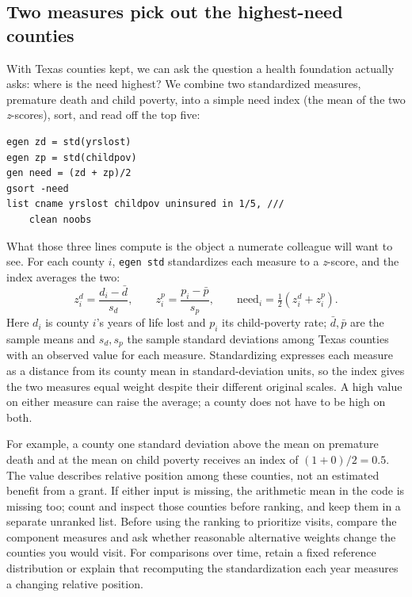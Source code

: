 \documentclass[
    a4paper,
    fontsize=10pt,
    twoside=true,
    numbers=noenddot,
]{kaobook}
\begin{document}
\subsection{Two measures pick out the highest-need counties}\label{sec:ch04-needindex}
With Texas counties kept, we can ask the question a health foundation actually asks: where is the need highest? We combine two standardized measures, premature death and child poverty, into a simple need index (the mean of the two \emph{z}-scores), sort, and read off the top five:
\par
{\footnotesize
\begin{verbatim}
egen zd = std(yrslost)
egen zp = std(childpov)
gen need = (zd + zp)/2
gsort -need
list cname yrslost childpov uninsured in 1/5, ///
    clean noobs
\end{verbatim}
}
What those three lines compute is the object a numerate colleague will
want to see. For each county $i$, \texttt{egen std} standardizes each
measure to a \emph{z}-score, and the index averages the two:
\[
z^{d}_i=\frac{d_i-\bar d}{s_d},\qquad
z^{p}_i=\frac{p_i-\bar p}{s_p},\qquad
\text{need}_i=\tfrac{1}{2}\!\left(z^{d}_i+z^{p}_i\right).
\]
Here $d_i$ is county $i$'s years of life lost and $p_i$ its child-poverty
rate; $\bar d,\bar p$ are the sample means and $s_d,s_p$ the sample
standard deviations among Texas counties with an observed value for each measure. Standardizing expresses each measure as a distance from its county mean in standard-deviation units, so the index gives the two measures equal weight despite their different original scales. A high value on either measure can raise the average; a county does not have to be high on both.

For example, a county one standard deviation above the mean on premature death and at the mean on child poverty receives an index of $(1+0)/2=0.5$. The value describes relative position among these counties, not an estimated benefit from a grant. If either input is missing, the arithmetic mean in the code is missing too; count and inspect those counties before ranking, and keep them in a separate unranked list. Before using the ranking to prioritize visits, compare the component measures and ask whether reasonable alternative weights change the counties you would visit. For comparisons over time, retain a fixed reference distribution or explain that recomputing the standardization each year measures a changing relative position.
\end{document}
